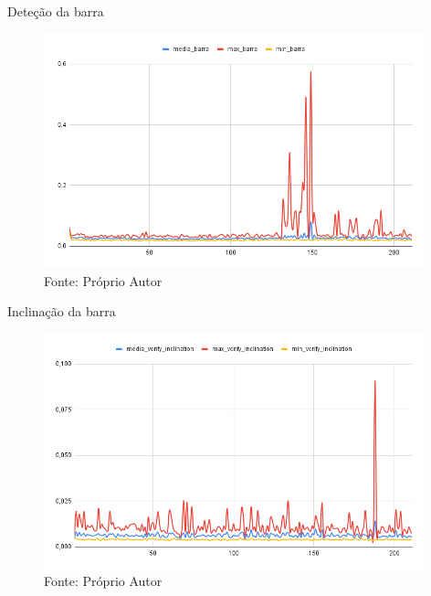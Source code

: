 
\begin{frame}{Deteção da barra}
   \begin{figure}[H]
    \includegraphics[width=11cm]{img/resultados/barra.png}
    {Fonte: Próprio Autor}
    \label{figura:configs_server}
    \end{figure}
\end{frame}

\begin{frame}{Inclinação da barra}
   \begin{figure}[H]
    \includegraphics[width=11cm]{img/resultados/inclination.png}
    {Fonte: Próprio Autor}
    \label{figura:configs_server}
    \end{figure}
\end{frame}


